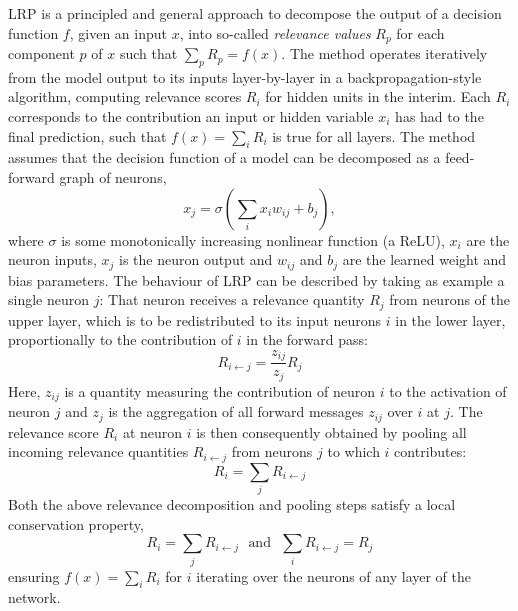 \documentclass[10pt,twocolumn,letterpaper]{article}
\begin{document}
LRP is a principled and general approach to decompose the output of a decision function $f$, given an input $x$, into so-called \emph{relevance values} $R_p$ for each component $p$ of $x$ such that $\sum_p R_p = f(x)$.
The method operates iteratively from the model output to its inputs layer-by-layer in a backpropagation-style algorithm, computing relevance scores $R_i$ for hidden units in the interim. Each $R_i$ corresponds to the contribution an input or hidden variable $x_i$ has had to the final prediction, such that $f(x) = \sum_i R_i$ is true for all layers.
The method assumes that the decision function of a model can be decomposed as a feed-forward graph of neurons, \eg
\begin{equation}
x_j = \sigma\left(\sum_i x_iw_{ij} + b_j\right),
\end{equation}
where $\sigma$ is some monotonically increasing nonlinear function (\eg a ReLU), $x_i$ are the neuron inputs, $x_j$ is the neuron output and $w_{ij}$ and $b_j$ are the learned weight and bias parameters. The behaviour of LRP can be described by taking as example a single neuron $j$: That neuron receives a relevance quantity $R_j$ from neurons of the upper layer, which is to be redistributed to its input neurons $i$ in the lower layer, proportionally to the contribution of $i$ in the forward pass:
\begin{equation}
R_{i\leftarrow j} = \frac{z_{ij}}{z_j} R_j
\label{eq:lrpdecompose}
\end{equation}
Here, $z_{ij}$ is a quantity measuring the contribution of neuron $i$ to the activation of neuron $j$ and $z_j$ is the aggregation of all forward messages $z_{ij}$ over $i$ at $j$. 
The relevance score $R_i$ at neuron $i$ is then consequently obtained by pooling all incoming relevance quantities $R_{i\leftarrow j}$ from neurons $j$ to which $i$ contributes:
\begin{equation}
R_i = \sum_j R_{i \leftarrow j}
\label{eq:lrppool}
\end{equation}
Both the above relevance decomposition and pooling steps satisfy a local conservation property, \ie
\begin{equation}
R_i = \sum_j R_{i \leftarrow j}~~~\text{and}~~~\sum_i R_{i\leftarrow j} = R_j
\label{eq:lrpconservation}
\end{equation}
ensuring $f(x) = \sum_i R_i$ for $i$ iterating over the neurons of any layer of the network.
\end{document}
